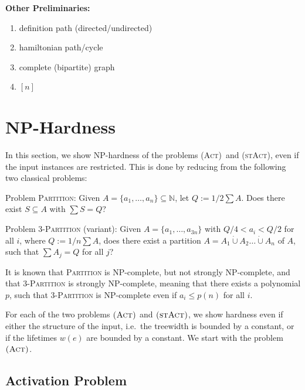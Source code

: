 \documentclass[10pt,a4paper]{article}
\numberwithin{equation}{section}
\newcommand{\N}{\mathbb{N}}
\newcommand{\set}[1]{\{ #1 \}}
\newcommand{\dotunion}{\mathbin{\dot{\cup}}}
\newcommand{\act}{\textsc{(Act)}}
\newcommand{\stact}{\textsc{(stAct)}}
\begin{document}
\textbf{ Other Preliminaries: }
\begin{enumerate}
\item definition path (directed/undirected)
\item hamiltonian path/cycle
\item complete (bipartite) graph
\item $[n]$
\end{enumerate}

\section{NP-Hardness}
\label{sec:hardness}

In this section, we show NP-hardness of the problems \act\ and \stact, even if the input instances are restricted. This is done by reducing from the following two classical problems:

\vspace*{0.2cm}

Problem \textsc{Partition}: Given $A = \set{a_1, \ldots, a_n} \subseteq \N$, let $Q := 1/2 \sum A$. Does there exist $S \subseteq A$ with $\sum S = Q$?

\vspace*{0.2cm}

Problem \textsc{3-Partition} (variant): Given $A = \set{a_1, \ldots, a_{3n}}$ with $Q/4 < a_i < Q/2$ for all $i$, where $Q := 1/n \sum A$, does there exist a partition $A = A_1 \dotunion A_2 \ldots \dotunion A_n$ of $A$, such that $\sum A_j = Q$ for all $j$?

\vspace*{0.2cm}

It is known that \textsc{Partition} is NP-complete, but not strongly NP-complete, and that \textsc{3-Partition} is strongly NP-complete, meaning that there exists a polynomial $p$, such that \textsc{3-Partition} is NP-complete even if $a_i \leq p(n)$ for all $i$.

For each of the two problems $\act$ and $\stact$, we show hardness even if either the structure of the input, i.e.\ the treewidth is bounded by a constant, or if the lifetimes $w(e)$ are bounded by a constant. We start with the problem $\act$.

\subsection{Activation Problem}
\end{document}
